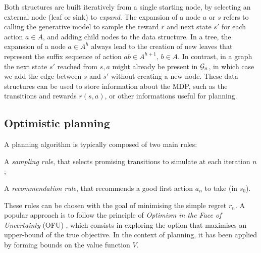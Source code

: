 \documentclass[runningheads]{llncs}
\begin{document}
Both structures are built iteratively from a single starting node, by selecting an external node (leaf or sink) to \emph{expand}. The expansion of a node $a$ or $s$ refers to calling the generative model to sample the reward $r$ and next state $s'$ for each action $a\in A$, and adding child nodes to the data structure. In a tree, the expansion of a node $a\in A^h$ always lead to the creation of new leaves that represent the suffix sequence of action $ab\in A^{h+1},\, b\in A$. In contrast, in a graph the next state $s'$ reached from $s,a$ might already be present in $\mathcal{G}_n$, in which case we add the edge between $s$ and $s'$ without creating a new node.
These data structures can be used to store information about the MDP, such as the transitions and rewards $r(s, a)$, or other informations useful for planning.


\subsection{Optimistic planning}

A planning algorithm is typically composed of two main rules:
\begin{enumerate*}[label=(\roman*)]
	\item A \emph{sampling rule}, that selects promising transitions to simulate at each iteration $n$;
	\item A \emph{recommendation rule}, that recommends a good first action $a_n$ 	to take (in $s_0$).
\end{enumerate*}
These rules can be chosen with the goal of minimising the simple regret $r_n$.
A popular approach is to follow the principle of \emph{Optimism in the Face of Uncertainty} (OFU) \citep[see][]{Munos14}, which consists in exploring the option that maximises an upper-bound of the true objective. In the context of planning, it has been applied by forming bounds on the value function $V$.
\end{document}
